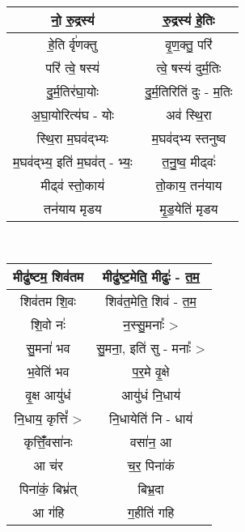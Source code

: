 {\centering
{\small {}} \\
\begin{longtable}{|c|c|}
\hline
नो॒ रु॒द्रस्य॑                     & रु॒द्रस्य॑ हे॒तिः\\
\hline
हे॒ति र्वृ॑णक्तु                    & वृ॒ण॒क्तु॒ परि॑\\
\hline
परि॑ त्वे॒ षस्य॑                    & त्वे॒ षस्य॑ दुर्म॒तिः\\
\hline
दु॒र्म॒तिर॑घा॒योः                  & दु॒र्म॒तिरिति॑ दुः - म॒तिः\\
\hline
अ॒घा॒योरित्य॑घ - योः             & अव॑ स्थि॒रा\\
\hline
स्थि॒रा म॒घव॑द्भ्यः                & म॒घव॑द्भ्य स्तनुष्व\\
\hline
म॒घव॑द्भ्य॒ इति॑ म॒घव॑त् - भ्यः॒        & त॒नु॒ष्व॒ मीढ्वः॑\\
\hline
मीढ्व॑ स्तो॒काय॑                  & तो॒काय॒ तन॑याय\\
\hline
तन॑याय मृडय                    & मृ॒ड॒येति॑ मृडय\\
\hline
\end{longtable}
}
{\centering
{\small {}} \\
\begin{longtable}{|c|c|}
\hline
मीढु॑ष्टम॒ शिव॑तम                 & मीढु॑ष्ट॒मेति॒ मीढुः॑ - त॒म॒\\
\hline
शिव॑तम शि॒वः                   & शिव॑त॒मेति॒ शिव॑ - त॒म॒\\
\hline
शि॒वो नः॑                      & न॒स्सु॒मनाः᳚ >\\
\hline
सु॒मना॑ भव                      & सु॒मना॒, इति॑ सु - मनाः᳚ >\\
\hline
भ॒वेति॑ भव                      & प॒र॒मे वृ॒क्षे\\
\hline
वृ॒क्ष आयु॑धं                      & आयु॑धं नि॒धाय॑\\
\hline
नि॒धाय॒ कृत्तिं᳚ >                 & नि॒धायेति॑ नि - धाय॑\\
\hline
कृत्तिंँ॒वसा॑नः                     & वसा॑न॒ आ\\
\hline
आ च॑र                         & च॒र॒ पिना॑कं\\
\hline
पिना॑कं॒ बिभ्र॑त्                  & बिभ्र॒दा\\
\hline
आ ग॑हि                        & ग॒हीति॑ गहि\\
\hline
\end{longtable}
}
